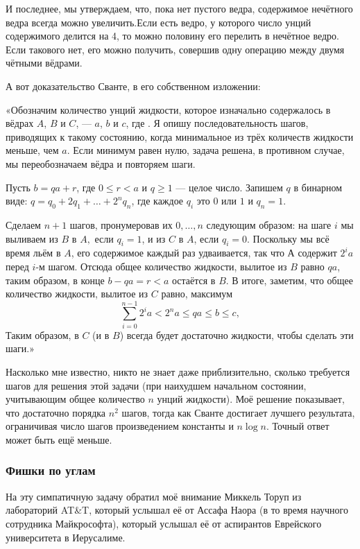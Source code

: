 И последнее, мы утверждаем, что, пока нет пустого ведра, содержимое нечётного ведра всегда можно увеличить.Если есть ведро, у которого число унций содержимого делится на 4, то можно половину его перелить в нечётное ведро.
Если такового нет, его можно получить, совершив одну операцию между двумя чётными вёдрами.
\heart

А вот доказательство Сванте, в его собственном изложении:

«Обозначим количество унций жидкости, которое изначально содержалось в вёдрах $A$, $B$ и $C$, --- $a$, $b$ и $c$, где .
Я опишу последовательность шагов, приводящих к такому состоянию, когда минимальное из трёх количеств жидкости меньше, чем $a$.
Если минимум равен нулю, задача решена, в противном случае, мы переобозначаем вёдра и повторяем шаги.

Пусть $b = qa + r$, где $0\le r<a$ и $q\ge 1$ --- целое число.
Запишем $q$ в бинарном виде: $q=q_0+2q_1+\dots+2^nq_n$, где каждое $q_i$ это $0$ или $1$ и $q_n = 1$.

Сделаем $n + 1$ шагов, пронумеровав их $0,\dots, n$ следующим образом: на шаге $i$ мы выливаем из $B$ в $A,$ если $q_i = 1$, и из $C$ в $A$, если $q_i = 0$.
Поскольку мы всё время льём в $A$, его содержимое каждый раз удваивается, так что $А$ содержит $2^ia$ перед $i$-м шагом.
Отсюда общее количество жидкости, вылитое из $B$ равно $qa$, таким образом, в конце $b-qa=r<a$ остаётся в $B$.
В итоге, заметим, что общее количество жидкости, вылитое из $C$ равно, максимум
\[\sum_{i=0}^{n-1} 2^ia<2^na\le qa\le b\le c,\]
Таким образом, в $C$ (и в $B$) всегда будет достаточно жидкости, чтобы сделать эти шаги.»
\heart

Насколько мне известно, никто не знает даже приблизительно, сколько требуется шагов для решения этой задачи (при наихудшем начальном состоянии, учитывающим общее количество $n$ унций жидкости).
Моё решение показывает, что достаточно порядка $n^2$ шагов, тогда как Сванте достигает лучшего результата, ограничивая число шагов произведением константы и $n\log n$.
Точный ответ может быть ещё меньше.

\subsubsection*{Фишки по углам}%

На эту симпатичную задачу обратил моё внимание Миккель Торуп из лабораторий AT\&T, %
который услышал её от Ассафа Наора %
(в то время научного сотрудника Майкрософта), который услышал её от аспирантов Еврейского университета в Иерусалиме.

